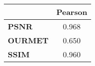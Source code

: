 \begin{tabular}{|l|c|}
\hline
&\textbf{Pearson}\\\hline
\textbf{PSNR}&0.968\\\hline
\textbf{OURMET}&0.650\\\hline
\textbf{SSIM}&0.960\\\hline
\end{tabular}
